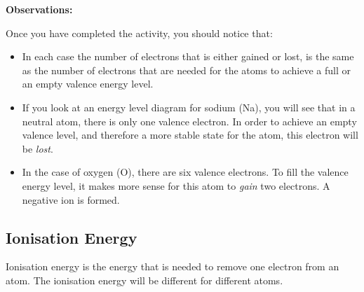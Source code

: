 
\textbf{Observations:\\}

Once you have completed the activity, you should notice that:

\begin{itemize}
\item{In each case the number of electrons that is either gained or lost, is the same as the number of electrons that are needed for the atoms to achieve a full or an empty valence energy level.}
\item{If you look at an energy level diagram for sodium (Na), you will see that in a neutral atom, there is only one valence electron. In order to achieve an empty valence level, and therefore a more stable state for the atom, this electron will be \textit{lost}.}
\item{In the case of oxygen (O), there are six valence electrons. To fill the valence energy level, it makes more sense for this atom to \textit{gain} two electrons. A negative ion is formed.}
\end{itemize}

\subsection{Ionisation Energy}

Ionisation energy is the energy that is needed to remove one electron from an atom. The ionisation energy will be different for different atoms.\\

